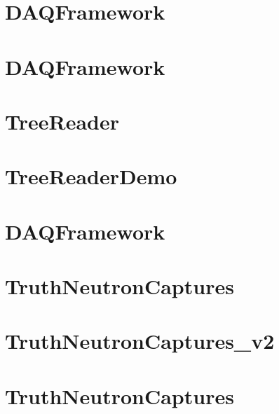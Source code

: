 \let\mypdfximage\pdfximage\def\pdfximage{\immediate\mypdfximage}\documentclass[twoside]{book}
\newcommand{\+}{\discretionary{\mbox{\scriptsize$\hookleftarrow$}}{}{}}
\begin{document}
\chapter{DAQFramework}
\label{md_UserTools_template_README}

\chapter{DAQFramework}
\label{md_UserTools_TestTool_README}

\chapter{Tree\+Reader}
\label{md_UserTools_TreeReader_README}

\chapter{Tree\+Reader\+Demo}
\label{md_UserTools_TreeReaderDemo_README}

\chapter{DAQFramework}
\label{md_UserTools_TrueNCaptures_README}

\chapter{Truth\+Neutron\+Captures}
\label{md_UserTools_TruthNeutronCaptures_README}

\chapter{Truth\+Neutron\+Captures\+\_\+v2}
\label{md_UserTools_TruthNeutronCaptures_v2_README}

\chapter{Truth\+Neutron\+Captures}
\label{md_UserTools_TruthNeutronCaptures_v3_README}

\end{document}
